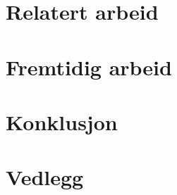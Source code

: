 \documentclass[12pt,twoside,norsk,onecolumn]{article}
\begin{document}
\section{Relatert arbeid}


\section{Fremtidig arbeid}


\section{Konklusjon}

\newpage

\section{Vedlegg}

\newpage




\end{document}

